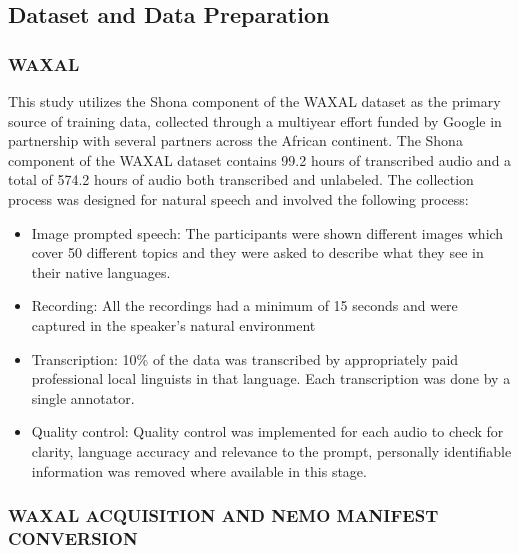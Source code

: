 {\subsection{Dataset and Data Preparation}

\subsubsection{WAXAL}

This study utilizes the Shona component of the WAXAL dataset \citep{Diack2026} as the primary source of training data, collected through a multiyear effort funded by Google in partnership with several partners across the African continent. The Shona component of the WAXAL dataset contains 99.2 hours of transcribed audio and a total of 574.2 hours of audio both transcribed and unlabeled. The collection process was designed for natural speech and involved the following process: 

\begin{itemize}
    \item Image prompted speech: The participants were shown different images which cover 50 different topics and they were asked to describe what they see in their native languages. 
    \item Recording: All the recordings had a minimum of 15 seconds and were captured in the speaker’s natural environment
    \item Transcription: 10\%  of the data was transcribed by appropriately paid professional local linguists in that language. Each transcription was done by a single annotator.
    \item Quality control: Quality control was implemented for each audio to check for clarity, language accuracy and relevance to the prompt, personally identifiable information was removed where available in this stage.
\end{itemize}

\subsubsection{WAXAL ACQUISITION AND NEMO MANIFEST CONVERSION}

}
